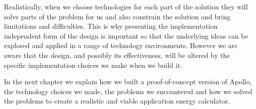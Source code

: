 Realistically, when we choose technologies for each part of the solution they will solve parts of the problem for us and also constrain the solution and bring limitations and difficulties.  This is why presenting the implementation independent form of the design is important so that the underlying ideas can be explored and applied in a range of technology environments.  However we are aware that the design, and possibly its effectiveness, will be altered by the specific implementation choices we make when we build it.

In the next chapter we explain how we built a proof-of-concept version of Apollo, the technology choices we made, the problems we encountered and how we solved the problems to create a realistic and viable application energy calculator.


